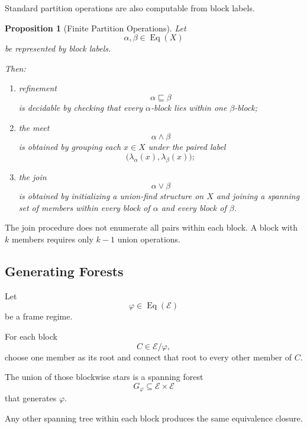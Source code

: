 \documentclass[11pt]{article}
\theoremstyle{plain}
\newtheorem{proposition}[theorem]{Proposition}
\theoremstyle{definition}
\theoremstyle{remark}
\begin{document}
Standard partition operations
are also computable from block labels.

\begin{proposition}[Finite Partition Operations]
  \label{ik.prop.partition-operations}
  Let
  \[
    \alpha,\beta
    \in
    \operatorname{Eq}(X)
  \]
  be represented by block labels.

  Then:
  \begin{enumerate}[label=(\alph*)]
    \item refinement
          \[
            \alpha
            \sqsubseteq
            \beta
          \]
          is decidable by checking that
          every \(\alpha\)-block lies within one \(\beta\)-block;
    \item the meet
          \[
            \alpha\wedge\beta
          \]
          is obtained by grouping each \(x\in X\)
          under the paired label
          \[
            \bigl(
            \lambda_{\alpha}(x),
            \lambda_{\beta}(x)
            \bigr);
          \]
    \item the join
          \[
            \alpha\vee\beta
          \]
          is obtained by initializing a union-find structure on \(X\)
          and joining a spanning set of members
          within every block of \(\alpha\)
          and every block of \(\beta\).
  \end{enumerate}
\end{proposition}

The join procedure does not enumerate
all pairs within each block.
A block with \(k\) members
requires only \(k-1\) union operations.

\subsection{Generating Forests}

Let
\[
  \varphi
  \in
  \operatorname{Eq}(\mathcal{E})
\]
be a frame regime.

For each block
\[
  C
  \in
  \mathcal{E}/\varphi,
\]
choose one member as its root
and connect that root
to every other member of \(C\).

The union of those blockwise stars
is a spanning forest
\[
  G_{\varphi}
  \subseteq
  \mathcal{E}\times\mathcal{E}
\]
that generates \(\varphi\).

Any other spanning tree within each block
produces the same equivalence closure.
\end{document}
